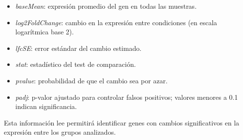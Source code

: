 \begin{itemize}
  \item \textit{baseMean}: expresión promedio del gen en todas las muestras.
  \item \textit{log2FoldChange}: cambio en la expresión entre condiciones (en escala logarítmica base 2).
  \item \textit{lfcSE}: error estándar del cambio estimado.
  \item \textit{stat}: estadístico del test de comparación.
  \item \textit{pvalue}: probabilidad de que el cambio sea por azar.
  \item \textit{padj}: p-valor ajustado para controlar falsos positivos; valores menores a 0.1 indican significancia.
\end{itemize}

Esta información lee permitirá identificar genes con cambios significativos en la expresión entre los grupos analizados.


